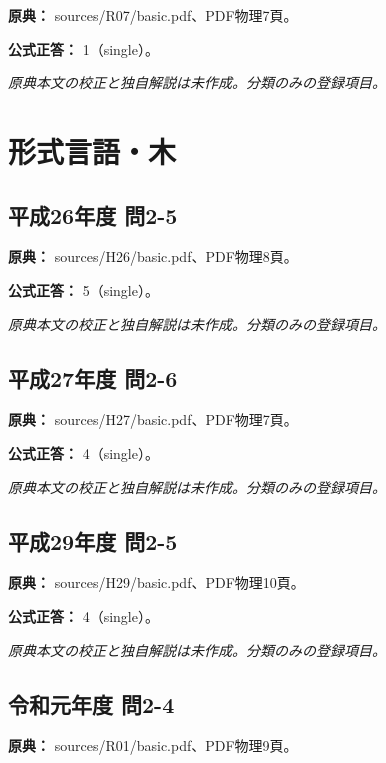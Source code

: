 \noindent\textbf{原典：} sources/R07/basic.pdf、PDF物理7頁。

\textbf{公式正答：} 1（single）。

\par\textit{原典本文の校正と独自解説は未作成。分類のみの登録項目。}

\section{形式言語・木}

\subsection{平成26年度 問2-5}
\label{q:h26-reg-basic-2-5}

\noindent\textbf{原典：} sources/H26/basic.pdf、PDF物理8頁。

\textbf{公式正答：} 5（single）。

\par\textit{原典本文の校正と独自解説は未作成。分類のみの登録項目。}

\subsection{平成27年度 問2-6}
\label{q:h27-reg-basic-2-6}

\noindent\textbf{原典：} sources/H27/basic.pdf、PDF物理7頁。

\textbf{公式正答：} 4（single）。

\par\textit{原典本文の校正と独自解説は未作成。分類のみの登録項目。}

\subsection{平成29年度 問2-5}
\label{q:h29-reg-basic-2-5}

\noindent\textbf{原典：} sources/H29/basic.pdf、PDF物理10頁。

\textbf{公式正答：} 4（single）。

\par\textit{原典本文の校正と独自解説は未作成。分類のみの登録項目。}

\subsection{令和元年度 問2-4}
\label{q:r01-reg-basic-2-4}

\noindent\textbf{原典：} sources/R01/basic.pdf、PDF物理9頁。

